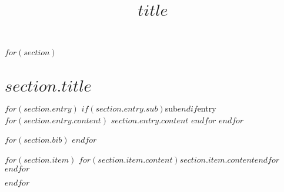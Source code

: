 \documentclass[a4paper]{moderncv}
\title{$title$}
\begin{document}
\maketitle
\nocite{*}

$for(section)$
\section{$section.title$}

$for(section.entry)$
\cv$if(section.entry.sub)$sub$endif$entry
$for(section.entry.content)$ {$section.entry.content$} $endfor$
$endfor$

$for(section.bib)$
\printbibliography[title={$section.bib.title$}, keyword=$section.bib.key$, heading=subbibliography]
$endfor$

$for(section.item)$
\cvitem
$for(section.item.content)${$section.item.content$}$endfor$
$endfor$

$endfor$
\end{document}
